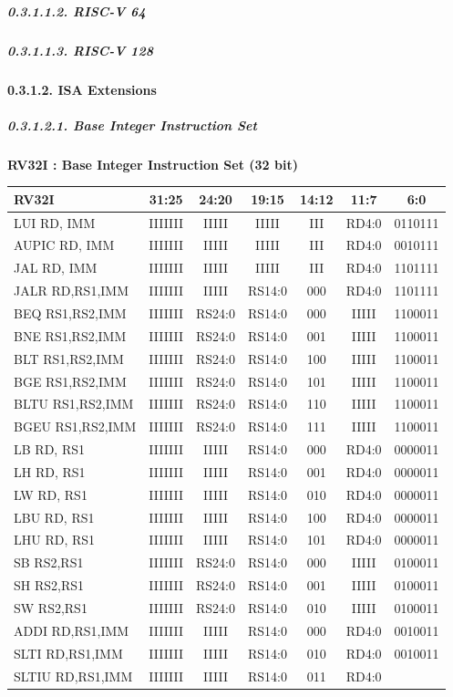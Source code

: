\documentclass[
]{article}
\begin{document}
\hypertarget{risc-v-64-1}{%
\subparagraph{0.3.1.1.2. RISC-V 64}\label{risc-v-64-1}}

\hypertarget{risc-v-128-1}{%
\subparagraph{0.3.1.1.3. RISC-V 128}\label{risc-v-128-1}}

\hypertarget{isa-extensions-3}{%
\paragraph{0.3.1.2. ISA Extensions}\label{isa-extensions-3}}

\hypertarget{base-integer-instruction-set-1}{%
\subparagraph{0.3.1.2.1. Base Integer Instruction
Set}\label{base-integer-instruction-set-1}}

\textbf{RV32I : Base Integer Instruction Set (32 bit)}

\begin{longtable}[]{@{}lcccccc@{}}
\toprule
RV32I & 31:25 & 24:20 & 19:15 & 14:12 & 11:7 & 6:0\tabularnewline
\midrule
\endhead
LUI RD, IMM & IIIIIII & IIIII & IIIII & III & RD4:0 &
0110111\tabularnewline
AUPIC RD, IMM & IIIIIII & IIIII & IIIII & III & RD4:0 &
0010111\tabularnewline
JAL RD, IMM & IIIIIII & IIIII & IIIII & III & RD4:0 &
1101111\tabularnewline
JALR RD,RS1,IMM & IIIIIII & IIIII & RS14:0 & 000 & RD4:0 &
1101111\tabularnewline
BEQ RS1,RS2,IMM & IIIIIII & RS24:0 & RS14:0 & 000 & IIIII &
1100011\tabularnewline
BNE RS1,RS2,IMM & IIIIIII & RS24:0 & RS14:0 & 001 & IIIII &
1100011\tabularnewline
BLT RS1,RS2,IMM & IIIIIII & RS24:0 & RS14:0 & 100 & IIIII &
1100011\tabularnewline
BGE RS1,RS2,IMM & IIIIIII & RS24:0 & RS14:0 & 101 & IIIII &
1100011\tabularnewline
BLTU RS1,RS2,IMM & IIIIIII & RS24:0 & RS14:0 & 110 & IIIII &
1100011\tabularnewline
BGEU RS1,RS2,IMM & IIIIIII & RS24:0 & RS14:0 & 111 & IIIII &
1100011\tabularnewline
LB RD, RS1 & IIIIIII & IIIII & RS14:0 & 000 & RD4:0 &
0000011\tabularnewline
LH RD, RS1 & IIIIIII & IIIII & RS14:0 & 001 & RD4:0 &
0000011\tabularnewline
LW RD, RS1 & IIIIIII & IIIII & RS14:0 & 010 & RD4:0 &
0000011\tabularnewline
LBU RD, RS1 & IIIIIII & IIIII & RS14:0 & 100 & RD4:0 &
0000011\tabularnewline
LHU RD, RS1 & IIIIIII & IIIII & RS14:0 & 101 & RD4:0 &
0000011\tabularnewline
SB RS2,RS1 & IIIIIII & RS24:0 & RS14:0 & 000 & IIIII &
0100011\tabularnewline
SH RS2,RS1 & IIIIIII & RS24:0 & RS14:0 & 001 & IIIII &
0100011\tabularnewline
SW RS2,RS1 & IIIIIII & RS24:0 & RS14:0 & 010 & IIIII &
0100011\tabularnewline
ADDI RD,RS1,IMM & IIIIIII & IIIII & RS14:0 & 000 & RD4:0 &
0010011\tabularnewline
SLTI RD,RS1,IMM & IIIIIII & IIIII & RS14:0 & 010 & RD4:0 &
0010011\tabularnewline
SLTIU RD,RS1,IMM & IIIIIII & IIIII & RS14:0 & 011 & RD4:0 &

\end{longtable}
\end{document}
